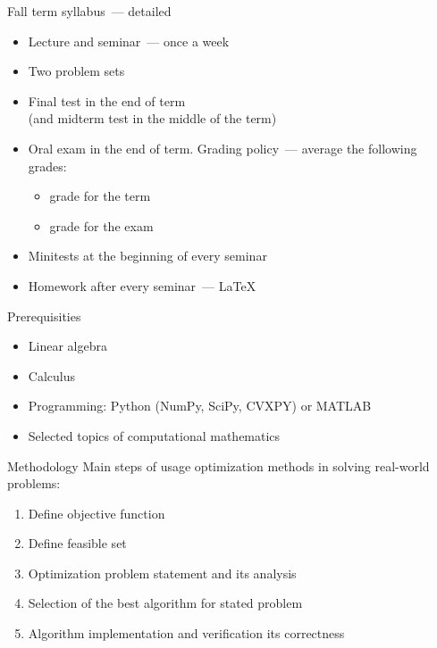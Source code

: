 \documentclass[12pt]{beamer}
\begin{document}
\begin{frame}{Fall term syllabus~--- detailed}
\begin{itemize}
\item Lecture and seminar~--- once a week
\item Two problem sets
\item Final test in the end of term \\ (and midterm test in the middle of the term)
\item Oral exam in the end of term. 
Grading policy~--- average the following grades:
\begin{itemize}
\item grade for the term 
\item grade for the exam
\end{itemize}
\item Minitests at the beginning of every seminar 
\item Homework after every seminar~--- \LaTeX
\end{itemize}
\end{frame}

\begin{frame}{Prerequisities}
\begin{itemize}
\item Linear algebra
\item Calculus
\item Programming: Python (NumPy, SciPy, CVXPY) or MATLAB
\item Selected topics of computational mathematics
\end{itemize}
\end{frame}

\begin{frame}{Methodology}
Main steps of usage optimization methods in solving real-world problems:
\begin{enumerate}
\item Define objective function
\item Define feasible set
\item Optimization problem statement and its analysis
\item Selection of the best algorithm for stated problem
\item Algorithm implementation and verification its correctness
\end{enumerate}

\end{frame}
\end{document}
